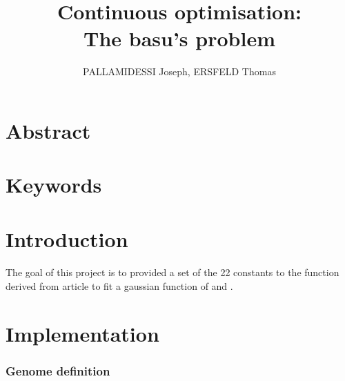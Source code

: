 \documentclass{article}
\begin{document}
  \title{Continuous optimisation: \\
    \large The basu's problem}
  \author{PALLAMIDESSI Joseph, ERSFELD Thomas}
  \maketitle
  
  \section{Abstract} %
  \label{sec:Abstract}
    \paragraph{} %
    \label{par:}
    

  \section{Keywords} %
  \label{sec:Keyword}
    \paragraph{} %
    \label{par:}
    
  
  \section{Introduction} %
  \label{sec:Intr}
    \paragraph{} %
    \label{par:}
    The goal of this project is to provided a set of the 22 constants to the
    function derived from article{\cite{} } to fit a gaussian function of  and
    .


  \section{Implementation} %
  \label{sec:Implementation}
    \subsubsection{Genome definition} %
    \label{ssub:Genome definition}
      
\end{document}
